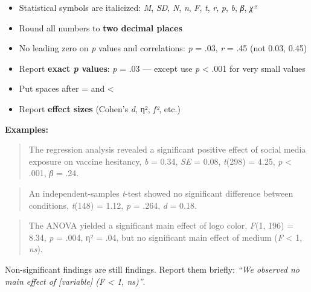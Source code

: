 \documentclass[
  11pt,
  a4paper,
]{scrbook}
\providecommand{\tightlist}{%
  \setlength{\itemsep}{0pt}\setlength{\parskip}{0pt}}\usepackage{longtable,booktabs,array}
\begin{document}
\begin{itemize}
\tightlist
\item
  Statistical symbols are italicized: \emph{M}, \emph{SD}, \emph{N},
  \emph{n}, \emph{F}, \emph{t}, \emph{r}, \emph{p}, \emph{b}, \emph{β},
  \emph{χ²}
\item
  Round all numbers to \textbf{two decimal places}
\item
  No leading zero on \emph{p} values and correlations: \emph{p} = .03,
  \emph{r} = .45 (not 0.03, 0.45)
\item
  Report \textbf{exact \emph{p} values}: \emph{p} = .03 --- except use
  \emph{p} \textless{} .001 for very small values
\item
  Put spaces after = and \textless{}
\item
  Report \textbf{effect sizes} (Cohen's \emph{d}, η², \emph{f²}, etc.)
\end{itemize}

\textbf{Examples:}

\begin{quote}
The regression analysis revealed a significant positive effect of social
media exposure on vaccine hesitancy, \emph{b} = 0.34, \emph{SE} = 0.08,
\emph{t}(298) = 4.25, \emph{p} \textless{} .001, \emph{β} = .24.
\end{quote}

\begin{quote}
An independent-samples \emph{t}-test showed no significant difference
between conditions, \emph{t}(148) = 1.12, \emph{p} = .264, \emph{d} =
0.18.
\end{quote}

\begin{quote}
The ANOVA yielded a significant main effect of logo color, \emph{F}(1,
196) = 8.34, \emph{p} = .004, η² = .04, but no significant main effect
of medium (\emph{F} \textless{} 1, \emph{ns}).
\end{quote}

\begin{tcolorbox}[enhanced jigsaw, bottomrule=.15mm, opacityback=0, toprule=.15mm, colframe=quarto-callout-important-color-frame, left=2mm, rightrule=.15mm, title=\textcolor{quarto-callout-important-color}{\faExclamation}\hspace{0.5em}{Report all effects, including non-significant ones}, colbacktitle=quarto-callout-important-color!10!white, bottomtitle=1mm, colback=white, breakable, toptitle=1mm, titlerule=0mm, leftrule=.75mm, arc=.35mm, opacitybacktitle=0.6, coltitle=black]

Non-significant findings are still findings. Report them briefly:
\emph{``We observed no main effect of {[}variable{]} (F \textless{} 1,
ns)''}.

\end{tcolorbox}
\end{document}
